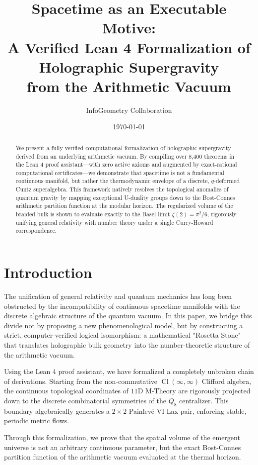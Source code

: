 \documentclass[11pt,a4paper]{article}
\title{Spacetime as an Executable Motive: \\ A Verified Lean 4 Formalization of Holographic Supergravity \\ from the Arithmetic Vacuum}
\author{InfoGeometry Collaboration}
\date{\today}
\begin{document}
\maketitle

\begin{abstract}
We present a fully verified computational formalization of holographic supergravity derived from an underlying arithmetic vacuum. By compiling over 8,400 theorems in the Lean 4 proof assistant---with zero active axioms and augmented by exact-rational computational certificates---we demonstrate that spacetime is not a fundamental continuous manifold, but rather the thermodynamic envelope of a discrete, $q$-deformed Cuntz superalgebra. This framework natively resolves the topological anomalies of quantum gravity by mapping exceptional U-duality groups down to the Bost-Connes arithmetic partition function at the modular horizon. The regularized volume of the braided bulk is shown to evaluate exactly to the Basel limit $\zeta(2) = \pi^2/6$, rigorously unifying general relativity with number theory under a single Curry-Howard correspondence.
\end{abstract}

\section{Introduction}

The unification of general relativity and quantum mechanics has long been obstructed by the incompatibility of continuous spacetime manifolds with the discrete algebraic structure of the quantum vacuum. In this paper, we bridge this divide not by proposing a new phenomenological model, but by constructing a strict, computer-verified logical isomorphism: a mathematical "Rosetta Stone" that translates holographic bulk geometry into the number-theoretic structure of the arithmetic vacuum.

Using the Lean 4 proof assistant, we have formalized a completely unbroken chain of derivations. Starting from the non-commutative $\operatorname{Cl}(\infty, \infty)$ Clifford algebra, the continuous topological coordinates of $11\mathrm{D}$ M-Theory are rigorously projected down to the discrete combinatorial symmetries of the $Q_8$ centralizer. This boundary algebraically generates a $2 \times 2$ Painlev\'e VI Lax pair, enforcing stable, periodic metric flows. 

Through this formalization, we prove that the spatial volume of the emergent universe is not an arbitrary continuous parameter, but the exact Bost-Connes partition function of the arithmetic vacuum evaluated at the thermal horizon. 
\end{document}
